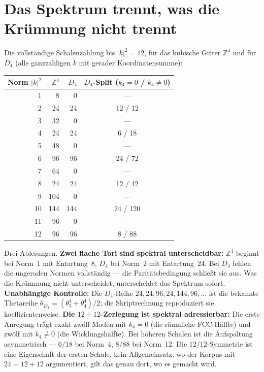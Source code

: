 \section{Das Spektrum trennt, was die Krümmung nicht trennt}

Die vollständige Schalenzählung bis $|k|^2 = 12$, für das kubische
Gitter $\mathbb{Z}^4$ und für $D_4$ (alle ganzzahligen $k$ mit gerader
Koordinatensumme):

\begin{center}
\small
\begin{tabular}{rrrc}
\toprule
Norm $|k|^2$ & $\mathbb{Z}^4$ & $D_4$ & $D_4$-Split ($k_4{=}0$ / $k_4{\ne}0$) \\
\midrule
1 & 8 & 0 & --- \\
2 & 24 & 24 & 12 / 12 \\
3 & 32 & 0 & --- \\
4 & 24 & 24 & 6 / 18 \\
5 & 48 & 0 & --- \\
6 & 96 & 96 & 24 / 72 \\
7 & 64 & 0 & --- \\
8 & 24 & 24 & 12 / 12 \\
9 & 104 & 0 & --- \\
10 & 144 & 144 & 24 / 120 \\
11 & 96 & 0 & --- \\
12 & 96 & 96 & 8 / 88 \\
\bottomrule
\end{tabular}
\end{center}

Drei Ablesungen. \textbf{Zwei flache Tori sind spektral
unterscheidbar:} $\mathbb{Z}^4$ beginnt bei Norm~1 mit Entartung~8,
$D_4$ bei Norm~2 mit Entartung~24. Bei $D_4$ fehlen die ungeraden Normen
vollständig --- die Paritätsbedingung schließt sie aus. Was die
Krümmung nicht unterscheidet, unterscheidet das Spektrum sofort.
\textbf{Unabhängige Kontrolle:} Die $D_4$-Reihe $24,24,96,24,144,96,\dots$
ist die bekannte Thetareihe $\theta_{D_4} = (\theta_3^4+\theta_4^4)/2$;
die Skriptrechnung reproduziert sie koeffizientenweise. \textbf{Die
$12+12$-Zerlegung ist spektral adressierbar:} Die erste Anregung trägt
exakt zwölf Moden mit $k_4 = 0$ (die räumliche FCC-Hälfte) und zwölf mit
$k_4\ne0$ (die Wicklungshälfte). Bei höheren Schalen ist die Aufspaltung
asymmetrisch --- $6/18$ bei Norm~4, $8/88$ bei Norm~12. Die
$12/12$-Symmetrie ist eine Eigenschaft der ersten Schale, kein
Allgemeinsatz; wo der Korpus mit $24 = 12+12$ argumentiert, gilt das genau
dort, wo es gemacht wird.


